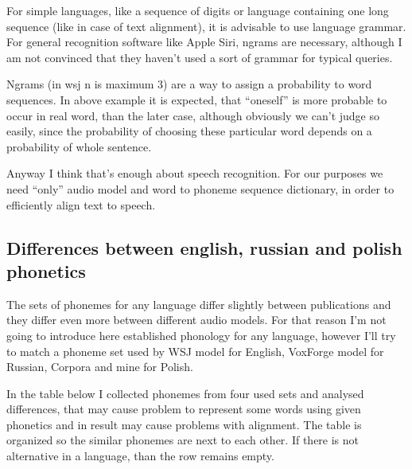 \documentclass[12pt,a4paper,english]{article}
\begin{document}
For simple languages, like a sequence of digits or language containing one long sequence (like in case of text alignment), it is advisable to use language grammar. \newline
For general recognition software like Apple Siri, ngrams are necessary, although I am not convinced that they haven't used a sort of grammar for typical queries. \newline

Ngrams (in wsj n is maximum 3) are a way to assign a probability to word sequences. In above example it is expected, that “oneself” is more probable to occur in real word, than the later case, although obviously we can't judge so easily, since the probability of choosing these particular word depends on a probability of whole sentence. \newline

Anyway I think that's enough about speech recognition. \newline
For our purposes we need “only” audio model and word to phoneme sequence dictionary, in order to efficiently  align text to speech. \newline

\newpage
\subsection{Differences between english, russian and polish phonetics}

The sets of phonemes for any language differ slightly between publications and they differ even more between different audio models. For that reason I'm not going to introduce here established phonology for any language, however I'll try to match a phoneme set used by WSJ model for English, VoxForge model for Russian, Corpora and mine for Polish. \newline

In the table below I collected phonemes from four used sets and analysed differences, that may cause problem to represent some words using given phonetics and in result may cause problems with alignment. The table is organized so the similar phonemes are next to each other. If there is not alternative in a language, than the row remains empty. \newline

\newcommand{\strutA}[1]{%
\rule[0pt]{0pt}{#1}%
}
\end{document}
